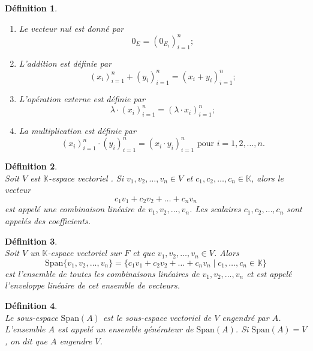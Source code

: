 \documentclass[a4paper, 14pt]{report}
\newtheorem{definition}{Définition}[section]
\begin{document}
\begin{onehalfspace}
{\begin{definition}
				\begin{enumerate}[label=\roman*)]
					\item Le vecteur nul est donné par 
					\[
					0_E = (0_{E_i})_{i=1}^{n};
					\]
					\item L'addition est définie par 
					\[
					(x_i)_{i=1}^{n} + (y_i)_{i=1}^{n} = (x_i + y_i)_{i=1}^{n};
					\]
					\item L'opération externe est définie par 
					\[
					\lambda \cdot (x_i)_{i=1}^{n} = (\lambda \cdot x_i)_{i=1}^{n};
					\]
					\item La multiplication est définie par
					\[
					(x_i)_{i=1}^{n} \cdot (y_i)_{i=1}^{n} = (x_i \cdot y_i)_{i=1}^{n} \text{ pour } i=1, 2, \dots, n.
					\]
				\end{enumerate}
			\end{definition}
			
			
			
			\begin{definition} \cite{lang2012algebra}\\
				Soit \( V \) est \(\mathbb{K}\)-espace vectoriel . Si \( v_1, v_2, \dots, v_n \in V \) et \( c_1, c_2, \dots, c_n \in \mathbb{K} \), alors le vecteur
				\[
				c_1 v_1 + c_2 v_2 + \dots + c_n v_n
				\]
				est appelé une combinaison linéaire de \( v_1, v_2, \dots, v_n \). Les scalaires \( c_1, c_2, \dots, c_n \) sont appelés des coefficients.
			\end{definition}
			
			\begin{definition}\cite{lang2012algebra}\\
				Soit \( V \) un \(\mathbb{K}\)-espace vectoriel sur \( F \) et que \( v_1, v_2, \dots, v_n \in V \). Alors
				\[
				\text{Span}\{v_1, v_2, \dots, v_n\} = \{ c_1 v_1 + c_2 v_2 + \dots + c_n v_n \mid c_1, \dots, c_n \in \mathbb{K} \}
				\]
				est l'ensemble de toutes les combinaisons linéaires de \( v_1, v_2, \dots, v_n \) et est appelé l'enveloppe linéaire de cet ensemble de vecteurs.
			\end{definition}
			
			
			\begin{definition} \cite{lang2012algebra} \\
				Le sous-espace \( \text{Span}(A) \) est le sous-espace vectoriel de \( V \) engendré par \( A \). L'ensemble \( A \) est appelé un ensemble générateur de \( \text{Span}(A) \). Si \( \text{Span}(A) = V \), on dit que \( A \) engendre \( V \).
			\end{definition}
			
}
\end{onehalfspace}
\end{document}
